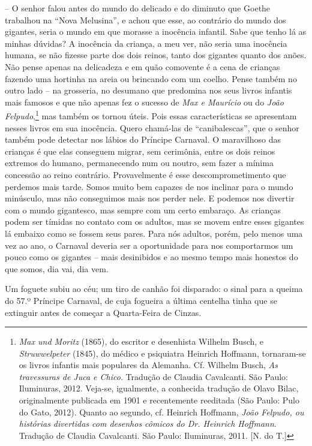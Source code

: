 -- O senhor falou antes do mundo do delicado e do diminuto que Goethe
trabalhou na ``Nova Melusina'', e achou que esse, ao contrário do mundo
dos gigantes, seria o mundo em que morasse a inocência infantil. Sabe
que tenho lá as minhas dúvidas? A inocência da criança, a meu ver, não
seria uma inocência humana, se não fizesse parte dos dois reinos, tanto
dos gigantes quanto dos anões. Não pense apenas na delicadeza e em quão
comovente é a cena de crianças fazendo uma hortinha na areia ou
brincando com um coelho. Pense também no outro lado -- na grosseria, no
desumano que predomina nos seus livros infantis mais famosos e que não
apenas fez o sucesso de \emph{Max e Maurício} ou do \emph{João
Felpudo},\footnote{\emph{Max und Moritz} (1865), do escritor e
  desenhista Wilhelm Busch, e \emph{Struwwelpeter} (1845), do médico e
  psiquiatra Heinrich Hoffmann, tornaram-se os livros infantis mais
  populares da Alemanha. Cf. Wilhelm Busch, \emph{As travessuras de Juca
  e Chico}. Tradução de Claudia Cavalcanti. São Paulo: Iluminuras, 2012.
  Veja-se, igualmente, a conhecida tradução de Olavo Bilac,
  originalmente publicada em 1901 e recentemente reeditada (São Paulo:
  Pulo do Gato, 2012). Quanto ao segundo, cf. Heinrich Hoffmann,
  \emph{João Felpudo, ou histórias divertidas com desenhos cômicos do
  Dr. Heinrich Hoffmann}. Tradução de Claudia Cavalcanti. São Paulo:
  Iluminuras, 2011. {[}N. do T.{]}} mas também os tornou úteis. Pois
essas características se apresentam nesses livros em sua inocência.
Quero chamá-las de ``canibalescas'', que o senhor também pode detectar
nos lábios do Príncipe Carnaval. O maravilhoso das crianças é que elas
conseguem migrar, sem cerimônia, entre os dois reinos extremos do
humano, permanecendo num ou noutro, sem fazer a mínima concessão ao
reino contrário. Provavelmente é esse descomprometimento que perdemos
mais tarde. Somos muito bem capazes de nos inclinar para o mundo
minúsculo, mas não conseguimos mais nos perder nele. E podemos nos
divertir com o mundo gigantesco, mas sempre com um certo embaraço. As
crianças podem ser tímidas no contato com os adultos, mas se movem entre
esses gigantes lá embaixo como se fossem seus pares. Para nós adultos,
porém, pelo menos uma vez ao ano, o Carnaval deveria ser a oportunidade
para nos comportarmos um pouco como os gigantes -- mais desinibidos e ao
mesmo tempo mais honestos do que somos, dia vai, dia vem.

Um foguete subiu ao céu; um tiro de canhão foi disparado: o sinal para a
queima do 57.º Príncipe Carnaval, de cuja fogueira a última centelha
tinha que se extinguir antes de começar a Quarta-Feira de Cinzas.

